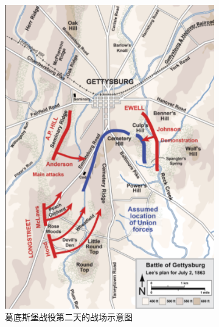 \documentclass{sicnuthesis}
\begin{document}
\begin{figure}[htb]
  \begin{subfigure}[b]{0.49\linewidth}
    \includegraphics[width=\linewidth]{gettysburg-map.png}
    \caption{葛底斯堡战役第二天的战场示意图}
  \end{subfigure}
  \begin{subfigure}[b]{0.49\linewidth}

\end{subfigure}
\end{figure}
\end{document}
